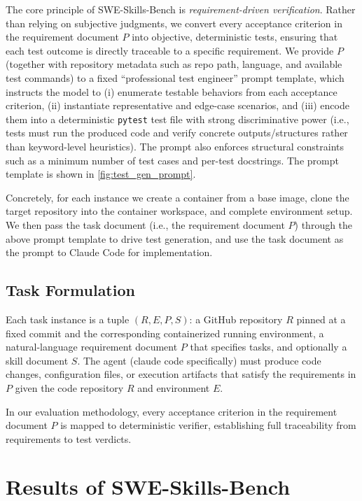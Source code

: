 \documentclass{article}
\newcommand{\ours}{SWE-Skills-Bench}
\begin{document}
The core principle of \ours{} is \emph{requirement-driven verification}. Rather than relying on subjective judgments, we convert every acceptance criterion in the requirement document $P$ into objective, deterministic tests, ensuring that each test outcome is directly traceable to a specific requirement.
We provide $P$ (together with repository metadata such as repo path, language, and available test commands) to a fixed “professional test engineer” prompt template, which instructs the model to (i) enumerate testable behaviors from each acceptance criterion, (ii) instantiate representative and edge-case scenarios, and (iii) encode them into a deterministic \texttt{pytest} test file with strong discriminative power (i.e., tests must run the produced code and verify concrete outputs/structures rather than keyword-level heuristics). The prompt also enforces structural constraints such as a minimum number of test cases and per-test docstrings. 
The prompt template is shown in \autoref{fig:test_gen_prompt}.

Concretely, for each instance we create a container from a base image, clone the target repository into the container workspace, and complete environment setup. We then pass the task document (i.e., the requirement document $P$) through the above prompt template to drive test generation, and use the task document as the prompt to Claude Code for implementation.


\subsection{Task Formulation}
\label{subsec:task_form}

Each task instance is a tuple $(R, E, P, S)$: a GitHub repository $R$ pinned at a fixed commit and the corresponding containerized running environment, a natural-language requirement document $P$ that specifies tasks, and optionally a skill document $S$. The agent (claude code specifically) must produce code changes, configuration files, or execution artifacts that satisfy the requirements in $P$ given the code repository $R$ and environment $E$.

In our evaluation methodology, every acceptance criterion in the requirement document $P$ is mapped to deterministic verifier, establishing full traceability from requirements to test verdicts.
\section{Results of \ours{}}
\label{sec:experiments}
\end{document}
